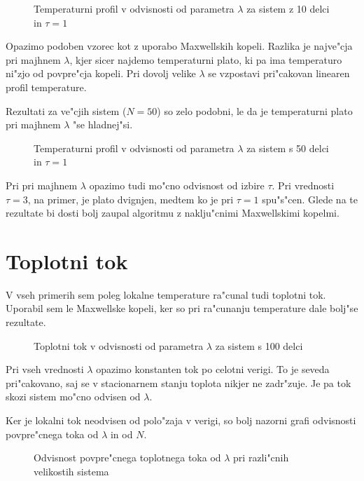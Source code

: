 \documentclass[a4paper,10pt]{article}
\begin{document}
\begin{figure}[H]
\centering

\caption{Temperaturni profil v odvisnosti od parametra $\lambda$ za sistem z 10 delci in $\tau = 1$}
\end{figure}

Opazimo podoben vzorec kot z uporabo Maxwellskih kopeli. 
Razlika je najve"cja pri majhnem $\lambda$, kjer sicer najdemo temperaturni plato, ki pa ima temperaturo ni"zjo od povpre"cja kopeli. 
Pri dovolj velike $\lambda$ se vzpostavi pri"cakovan linearen profil temperature. 

Rezultati za ve"cjih sistem ($N=50$) so zelo podobni, le da je temperaturni plato pri majhnem $\lambda$ "se hladnej"si. 

\begin{figure}[H]
\centering

\caption{Temperaturni profil v odvisnosti od parametra $\lambda$ za sistem s 50 delci in $\tau = 1$}
\end{figure}

Pri pri majhnem $\lambda$ opazimo tudi mo"cno odvisnost od izbire $\tau$. 
Pri vrednosti $\tau = 3$, na primer, je plato dvignjen, medtem ko je pri $\tau = 1$ spu"s"cen. 
Glede na te rezultate bi dosti bolj zaupal algoritmu z naklju"cnimi Maxwellskimi kopelmi. 

\section{Toplotni tok}

V vseh primerih sem poleg lokalne temperature ra"cunal tudi toplotni tok. 
Uporabil sem le Maxwellske kopeli, ker so pri ra"cunanju temperature dale bolj"se rezultate. 

\begin{figure}[H]
 \centering
 
  \caption{Toplotni tok v odvisnosti od parametra $\lambda$ za sistem s 100 delci}
\end{figure}

Pri vseh vrednosti $\lambda$ opazimo konstanten tok po celotni verigi. 
To je seveda pri"cakovano, saj se v stacionarnem stanju toplota nikjer ne zadr"zuje. 
Je pa tok skozi sistem mo"cno odvisen od $\lambda$. 

Ker je lokalni tok neodvisen od polo"zaja v verigi, so bolj nazorni grafi odvisnosti povpre"cnega toka od $\lambda$ in od $N$. 

\begin{figure}[H]
 \centering
 
\caption{Odvisnost povpre"cnega toplotnega toka od $\lambda$ pri razli"cnih velikostih sistema}
\end{figure}
\end{document}
